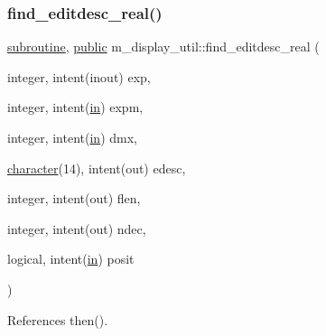 \subsubsection{\texorpdfstring{find\+\_\+editdesc\+\_\+real()}{find\_editdesc\_real()}}
{\footnotesize\ttfamily \hyperlink{M__stopwatch_83_8txt_acfbcff50169d691ff02d4a123ed70482}{subroutine}, \hyperlink{M__stopwatch_83_8txt_a2f74811300c361e53b430611a7d1769f}{public} m\+\_\+display\+\_\+util\+::find\+\_\+editdesc\+\_\+real (\begin{DoxyParamCaption}\item[{integer, intent(inout)}]{exp,  }\item[{integer, intent(\hyperlink{M__journal_83_8txt_afce72651d1eed785a2132bee863b2f38}{in})}]{expm,  }\item[{integer, intent(\hyperlink{M__journal_83_8txt_afce72651d1eed785a2132bee863b2f38}{in})}]{dmx,  }\item[{\hyperlink{option__stopwatch_83_8txt_abd4b21fbbd175834027b5224bfe97e66}{character}(14), intent(out)}]{edesc,  }\item[{integer, intent(out)}]{flen,  }\item[{integer, intent(out)}]{ndec,  }\item[{logical, intent(\hyperlink{M__journal_83_8txt_afce72651d1eed785a2132bee863b2f38}{in})}]{posit }\end{DoxyParamCaption})}



References then().

